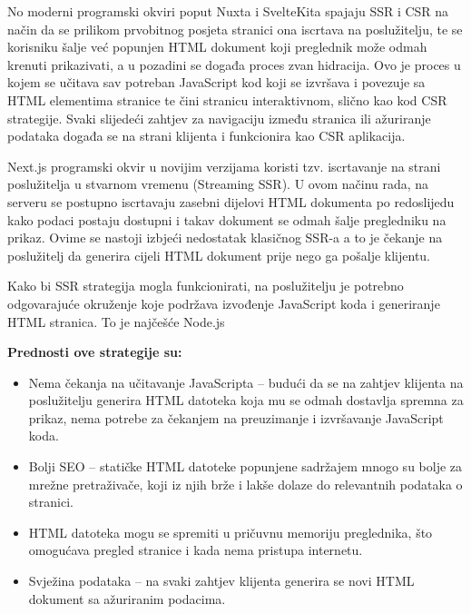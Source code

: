 \bigskip

No moderni programski okviri poput Nuxta i SvelteKita spajaju SSR i CSR na način da se prilikom prvobitnog posjeta stranici ona iscrtava na poslužitelju, te se korisniku šalje već popunjen HTML dokument koji preglednik može odmah krenuti prikazivati, a u pozadini se događa proces zvan hidracija. Ovo je proces u kojem se učitava sav potreban JavaScript kod koji se izvršava i povezuje sa HTML elementima stranice te čini stranicu interaktivnom, slično kao kod CSR strategije. Svaki slijedeći zahtjev za navigaciju između stranica ili ažuriranje podataka događa se na strani klijenta i funkcionira kao CSR aplikacija.

\bigskip

Next.js programski okvir u novijim verzijama koristi tzv. iscrtavanje na strani poslužitelja u stvarnom vremenu (Streaming SSR). U ovom načinu rada, na serveru se postupno iscrtavaju zasebni dijelovi HTML dokumenta po redoslijedu kako podaci postaju dostupni i takav dokument se odmah šalje pregledniku na prikaz. Ovime se nastoji izbjeći nedostatak klasičnog SSR-a a to je čekanje na poslužitelj da generira cijeli HTML dokument prije nego ga pošalje klijentu.  \cite{nextjsloading}

\bigskip

Kako bi SSR strategija mogla funkcionirati, na poslužitelju je potrebno odgovarajuće okruženje koje podržava izvođenje JavaScript koda i generiranje HTML stranica. To je najčešće Node.js \cite{vuejsssr}

\bigskip

\textbf{Prednosti ove strategije su:}

\begin{itemize}
    \item Nema čekanja na učitavanje JavaScripta – budući da se na zahtjev klijenta na poslužitelju generira HTML datoteka koja mu se odmah dostavlja spremna za prikaz, nema potrebe za čekanjem na preuzimanje i izvršavanje JavaScript koda.
    \item Bolji SEO – statičke HTML datoteke popunjene sadržajem mnogo su bolje za mrežne pretraživače, koji iz njih brže i lakše dolaze do relevantnih podataka o stranici.
    \item HTML datoteka mogu se spremiti u pričuvnu memoriju preglednika, što omogućava pregled stranice i kada nema pristupa internetu.
    \item Svježina podataka – na svaki zahtjev klijenta generira se novi HTML dokument sa ažuriranim podacima.
\end{itemize}

